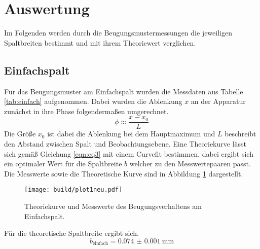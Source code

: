 \section{Auswertung}

Im Folgenden werden durch die Beugungsmustermessungen die jeweiligen Spaltbreiten bestimmt und mit ihrem Theoriewert verglichen.

\subsection{Einfachspalt}

Für das Beugungsmuster am Einfachspalt wurden die Messdaten aus Tabelle \ref{tab:einfach} aufgenommen. Dabei wurden die Ablenkung $x$ an der Apparatur zunächst in ihre Phase folgendermaßen umgerechnet.
\begin{equation}
\phi \approx \frac{x - x_{0}}{L}
\end{equation}    
Die Größe $x_{0}$ ist dabei die Ablenkung bei dem Hauptmaximum und $L$ beschreibt den Abstand zwischen Spalt und Beobachtungsebene.
Eine Theoriekurve lässt sich gemäß Gleichung \eqref{eqn:eq3} mit einem Curvefit bestimmen, dabei ergibt sich ein optimaler Wert für die Spaltbreite $b$ welcher zu den Messwertepaaren passt.
Die Messwerte sowie die Theoretische Kurve sind in Abbildung \ref{fig:plot1} dargestellt.
\begin{figure}
    \centering
    \texttt{[image: build/plot1neu.pdf]}
    \caption{Theoriekurve und Messwerte des Beugungsverhaltens am Einfachspalt.} 
    \label{fig:plot1}
\end{figure}
Für die theoretische Spaltbreite ergibt sich.
\begin{equation}
b_{\text{einfach}} = \SI{0.074(1)}{\milli\meter}
\end{equation}

